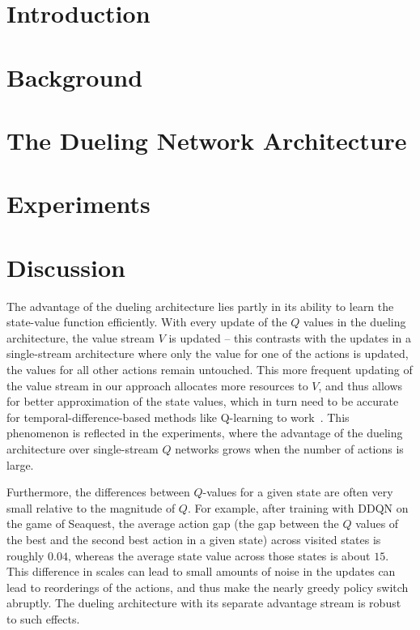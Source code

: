 \documentclass{article}
\begin{document}
\section{Introduction}
\label{sec:introduction}



\section{Background}
\label{sec:DRL}



\section{The Dueling Network Architecture}
\label{sec:dueling}



\section{Experiments}
\label{sec:experiments}





\section{Discussion}
\label{sec:discussion}
The advantage of the dueling architecture lies partly in its ability to learn the state-value function efficiently.
With every update of the $Q$ values in the dueling architecture,
the value stream ${V}$ is updated -- this contrasts with the updates in a single-stream architecture where only the value for one of the actions is updated, the values for all other actions remain untouched. This more frequent updating of the value stream in our approach allocates more resources to $V$, and thus allows for better approximation of the state values, which in turn need to be accurate for temporal-difference-based methods like Q-learning to work~\cite{SuttonBarto:1998}.
This phenomenon is reflected in the experiments, where the advantage of the dueling architecture over single-stream 	$Q$ networks grows when the number of actions is large.

Furthermore, the differences between $Q$-values for a given state are often very small relative to the magnitude of $Q$.
For example, after training with DDQN on the game of Seaquest, the average action gap (the gap between the $Q$ values of the best and the second best action in a given state) across visited states is roughly $0.04$, whereas the average state value across those states is about $15$.
This difference in scales can lead to small amounts of noise in the updates can lead to reorderings of the actions, and thus make the nearly greedy policy switch abruptly.
The dueling architecture with its separate advantage stream is robust to such effects.
\end{document}
